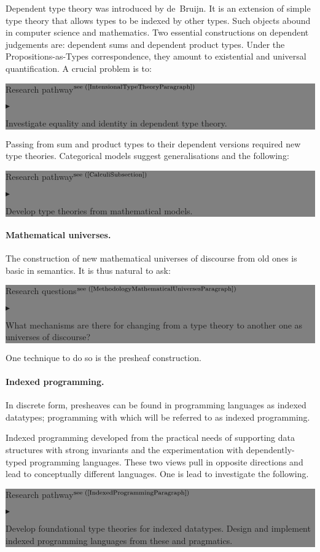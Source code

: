 \documentclass[11pt,twocolumn]{article}
\newenvironment{btritemize}
  {\begin{list}{\btr}
  {\setlength{\topsep}{2pt}
   \setlength{\partopsep}{2pt}
   \setlength{\itemsep}{2.5pt}
   \setlength{\parsep}{2.5pt}
   \setlength{\leftmargin}{1em}
   \setlength{\labelwidth}{.5em}}}
  {\end{list}}
\newcommand{\mytextsf}[1]{\textsf{\small #1}}
\newcommand{\eg}{\emph{eg.}}
\newcommand{\btr}{$\blacktriangleright$}
\newcommand{\reqpsize}{8.113395cm}%
\newcommand{\reqs}[2]{\begin{center}\colorbox{grey}{\begin{minipage}{\reqpsize}
  \mytextsf{Research questions}\hfill$^{\mbox{\scriptsize see (#1) }}$\\[-5.5mm]
  \begin{btritemize}
  \item #2
  \end{btritemize}
\end{minipage}}\end{center}}
\newcommand{\rep}[2]{\begin{center}\colorbox{grey}{\begin{minipage}{\reqpsize}
  \mytextsf{Research pathway}\hfill$^{\mbox{\scriptsize see (#1) }}$\\[-5.5mm]
  \begin{btritemize}
  \item #2
  \end{btritemize}
\end{minipage}}\end{center}}
\begin{document}
Dependent type theory was introduced by de~Bruijn. %
It is an extension of simple type theory that allows types to be indexed by
other types.  Such objects abound in computer science and mathematics.  
Two essential constructions on dependent judgements are: dependent sums and
dependent product types.  %
Under the Propositions-as-Types correspondence, they amount to existential and
universal quantification.  A crucial problem 
is to:
\rep{\ref{IntensionalTypeTheoryParagraph}}
  {Investigate equality and identity in dependent type theory.}

Passing from sum and product types to their dependent versions required new
type theories.  Categorical models suggest generalisations and the following: 
\rep{\ref{CalculiSubsection}}
  {Develop type theories from mathematical models.}

\paragraph*{Mathematical universes.}

The construction of new mathematical universes of discourse from old ones is
basic in semantics.  It is thus natural to ask:
\reqs{\ref{MethodologyMathematicalUniversesParagraph}}
  {What mechanisms are there for changing from a type theory to another one
    as universes of discourse? 
%
}

One technique to do so is the presheaf construction.  

\paragraph*{Indexed programming.}

In discrete form, pre\-sheaves can be found in programming languages as
indexed data\-types; programming with which will be referred to as indexed
programming.  

Indexed programming developed from the practical needs of supporting data
structures with strong invariants and the experimentation with
dependently-typed programming languages. %
These two views pull in opposite directions and lead to conceptually different
languages.  One is lead to investigate the following.
\rep{\ref{IndexedProgrammingParagraph}} 
  {Develop foundational type theories for indexed datatypes.  
   Design and implement indexed programming languages from these and
   pragmatics.}
\end{document}
